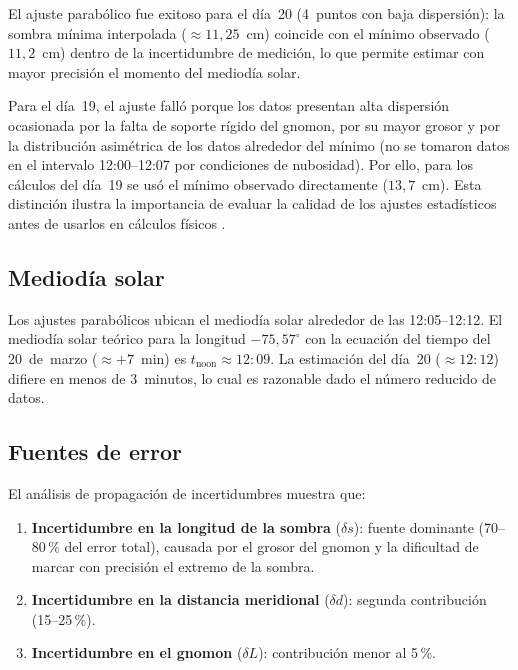 El ajuste parabólico fue exitoso para el día~20 (4~puntos con baja
dispersión): la sombra mínima interpolada ($\approx 11{,}25$~cm)
coincide con el mínimo observado ($11{,}2$~cm) dentro de la
incertidumbre de medición, lo que permite estimar con mayor precisión
el momento del mediodía solar.

Para el día~19, el ajuste falló porque los datos presentan alta
dispersión ocasionada por la falta de soporte rígido del gnomon, por
su mayor grosor y por la distribución asimétrica de los datos
alrededor del mínimo (no se tomaron datos en el intervalo 12:00--12:07
por condiciones de nubosidad).
Por ello, para los cálculos del día~19 se usó el mínimo observado
directamente ($13{,}7$~cm).
Esta distinción ilustra la importancia de evaluar la calidad de los
ajustes estadísticos antes de usarlos en cálculos físicos
\citep{Baird1991}.

\subsection{Mediodía solar}

Los ajustes parabólicos ubican el mediodía solar alrededor de las
12:05--12:12.
El mediodía solar teórico para la longitud $-75{,}57^\circ$ con la ecuación
del tiempo del 20~de~marzo ($\approx +7$~min) es
$t_\text{noon} \approx 12{:}09$.
La estimación del día~20 ($\approx 12{:}12$) difiere en menos de
3~minutos, lo cual es razonable dado el número reducido de datos.

\subsection{Fuentes de error}

El análisis de propagación de incertidumbres muestra que:

\begin{enumerate}
  \item \textbf{Incertidumbre en la longitud de la sombra} ($\delta s$):
        fuente dominante (70--80\,\% del error total), causada
        por el grosor del gnomon y la dificultad de marcar con precisión
        el extremo de la sombra.
  \item \textbf{Incertidumbre en la distancia meridional} ($\delta d$):
        segunda contribución (15--25\,\%).
  \item \textbf{Incertidumbre en el gnomon} ($\delta L$): contribución
        menor al 5\,\%.
\end{enumerate}

